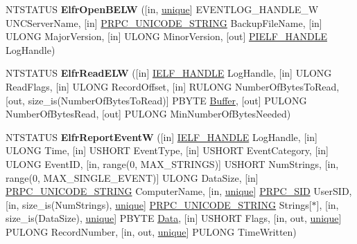 \begin{DoxyCompactItemize}
\item 
\mbox{\label{interfaceeventlog_a43707f6ff9792a8da9eeb0fe6b1ed5a3}} 
N\+T\+S\+T\+A\+T\+US {\bfseries Elfr\+Open\+B\+E\+LW} (\mbox{[}in, \hyperlink{interfaceunique}{unique}\mbox{]} E\+V\+E\+N\+T\+L\+O\+G\+\_\+\+H\+A\+N\+D\+L\+E\+\_\+W U\+N\+C\+Server\+Name, \mbox{[}in\mbox{]} \hyperlink{struct___r_p_c___u_n_i_c_o_d_e___s_t_r_i_n_g}{P\+R\+P\+C\+\_\+\+U\+N\+I\+C\+O\+D\+E\+\_\+\+S\+T\+R\+I\+NG} Backup\+File\+Name, \mbox{[}in\mbox{]} U\+L\+O\+NG Major\+Version, \mbox{[}in\mbox{]} U\+L\+O\+NG Minor\+Version, \mbox{[}out\mbox{]} \hyperlink{interfacevoid}{P\+I\+E\+L\+F\+\_\+\+H\+A\+N\+D\+LE} Log\+Handle)
\item 
\mbox{\label{interfaceeventlog_ad948db344e4c5cc387c512c09cb705c3}} 
N\+T\+S\+T\+A\+T\+US {\bfseries Elfr\+Read\+E\+LW} (\mbox{[}in\mbox{]} \hyperlink{interfacevoid}{I\+E\+L\+F\+\_\+\+H\+A\+N\+D\+LE} Log\+Handle, \mbox{[}in\mbox{]} U\+L\+O\+NG Read\+Flags, \mbox{[}in\mbox{]} U\+L\+O\+NG Record\+Offset, \mbox{[}in\mbox{]} R\+U\+L\+O\+NG Number\+Of\+Bytes\+To\+Read, \mbox{[}out, size\+\_\+is(Number\+Of\+Bytes\+To\+Read)\mbox{]} P\+B\+Y\+TE \hyperlink{class_buffer}{Buffer}, \mbox{[}out\mbox{]} P\+U\+L\+O\+NG Number\+Of\+Bytes\+Read, \mbox{[}out\mbox{]} P\+U\+L\+O\+NG Min\+Number\+Of\+Bytes\+Needed)
\item 
\mbox{\label{interfaceeventlog_a6d491aae3b93e7e344afd256949a938b}} 
N\+T\+S\+T\+A\+T\+US {\bfseries Elfr\+Report\+EventW} (\mbox{[}in\mbox{]} \hyperlink{interfacevoid}{I\+E\+L\+F\+\_\+\+H\+A\+N\+D\+LE} Log\+Handle, \mbox{[}in\mbox{]} U\+L\+O\+NG Time, \mbox{[}in\mbox{]} U\+S\+H\+O\+RT Event\+Type, \mbox{[}in\mbox{]} U\+S\+H\+O\+RT Event\+Category, \mbox{[}in\mbox{]} U\+L\+O\+NG Event\+ID, \mbox{[}in, range(0, M\+A\+X\+\_\+\+S\+T\+R\+I\+N\+GS)\mbox{]} U\+S\+H\+O\+RT Num\+Strings, \mbox{[}in, range(0, M\+A\+X\+\_\+\+S\+I\+N\+G\+L\+E\+\_\+\+E\+V\+E\+NT)\mbox{]} U\+L\+O\+NG Data\+Size, \mbox{[}in\mbox{]} \hyperlink{struct___r_p_c___u_n_i_c_o_d_e___s_t_r_i_n_g}{P\+R\+P\+C\+\_\+\+U\+N\+I\+C\+O\+D\+E\+\_\+\+S\+T\+R\+I\+NG} Computer\+Name, \mbox{[}in, \hyperlink{interfaceunique}{unique}\mbox{]} \hyperlink{struct___r_p_c___s_i_d}{P\+R\+P\+C\+\_\+\+S\+ID} User\+S\+ID, \mbox{[}in, size\+\_\+is(Num\+Strings), \hyperlink{interfaceunique}{unique}\mbox{]} \hyperlink{struct___r_p_c___u_n_i_c_o_d_e___s_t_r_i_n_g}{P\+R\+P\+C\+\_\+\+U\+N\+I\+C\+O\+D\+E\+\_\+\+S\+T\+R\+I\+NG} Strings\mbox{[}$\ast$\mbox{]}, \mbox{[}in, size\+\_\+is(Data\+Size), \hyperlink{interfaceunique}{unique}\mbox{]} P\+B\+Y\+TE \hyperlink{struct_data}{Data}, \mbox{[}in\mbox{]} U\+S\+H\+O\+RT Flags, \mbox{[}in, out, \hyperlink{interfaceunique}{unique}\mbox{]} P\+U\+L\+O\+NG Record\+Number, \mbox{[}in, out, \hyperlink{interfaceunique}{unique}\mbox{]} P\+U\+L\+O\+NG Time\+Written)

\end{DoxyCompactItemize}
